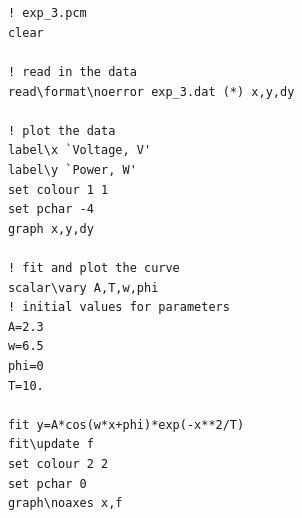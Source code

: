 \documentclass{article}
\begin{document}
{\tt 
\begin{verbatim}

      ! exp_3.pcm
      clear
      
      ! read in the data
      read\format\noerror exp_3.dat (*) x,y,dy

      ! plot the data
      label\x `Voltage, V'
      label\y `Power, W'
      set colour 1 1
      set pchar -4
      graph x,y,dy

      ! fit and plot the curve
      scalar\vary A,T,w,phi
      ! initial values for parameters
      A=2.3
      w=6.5
      phi=0
      T=10.

      fit y=A*cos(w*x+phi)*exp(-x**2/T)
      fit\update f
      set colour 2 2
      set pchar 0
      graph\noaxes x,f

\end{verbatim}
}
\end{document}
